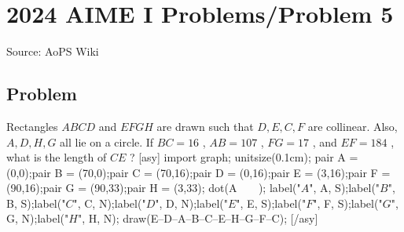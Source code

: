 \documentclass[12pt]{article}
\begin{document}
\section*{{2024 AIME I Problems/Problem 5}}
Source: AoPS Wiki

\subsection*{Problem}
Rectangles $ABCD$ and $EFGH$ are drawn such that $D,E,C,F$ are collinear. Also, $A,D,H,G$ all lie on a circle. If $BC=16$ , $AB=107$ , $FG=17$ , and $EF=184$ , what is the length of $CE$ ? [asy] import graph; unitsize(0.1cm); pair A = (0,0);pair B = (70,0);pair C = (70,16);pair D = (0,16);pair E = (3,16);pair F = (90,16);pair G = (90,33);pair H = (3,33); dot(A^^B^^C^^D^^E^^F^^G^^H); label("$A$", A, S);label("$B$", B, S);label("$C$", C, N);label("$D$", D, N);label("$E$", E, S);label("$F$", F, S);label("$G$", G, N);label("$H$", H, N); draw(E--D--A--B--C--E--H--G--F--C); [/asy]
\end{document}
